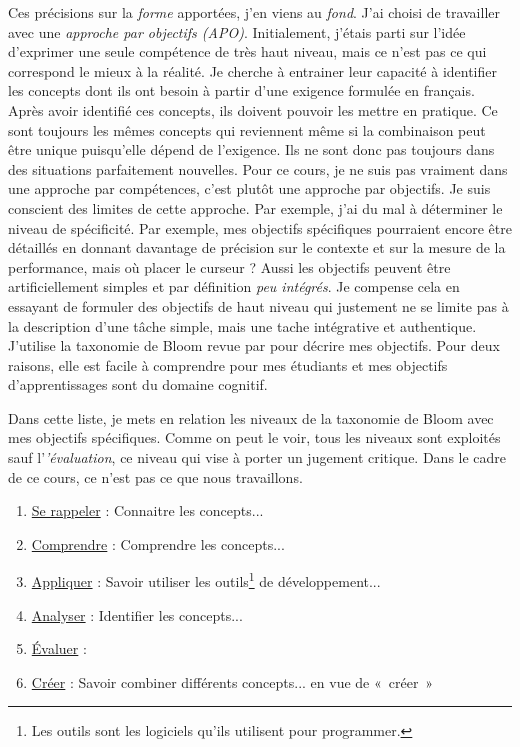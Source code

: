 Ces précisions sur la \emph{forme} apportées, j'en viens au \emph{fond}. J'ai choisi de travailler avec une \emph{approche par objectifs (APO)}. Initialement, j’étais parti sur l’idée d’exprimer une seule compétence de très haut niveau, mais ce n'est pas ce qui correspond le mieux à la réalité. Je cherche à entrainer leur capacité à identifier les concepts dont ils ont besoin à partir d'une exigence formulée en français. Après avoir identifié ces concepts, ils doivent pouvoir les mettre en pratique. Ce sont toujours les mêmes concepts qui reviennent même si la combinaison peut être unique puisqu'elle dépend de l'exigence. Ils ne sont donc pas toujours dans des situations parfaitement nouvelles. Pour ce cours, je ne suis pas vraiment dans une approche par compétences, c’est plutôt une approche par objectifs. Je suis conscient des limites de cette approche. Par exemple, j'ai du mal à déterminer le niveau de spécificité. Par exemple, mes objectifs spécifiques pourraient encore être détaillés en donnant davantage de précision sur le contexte et sur la mesure de la performance, mais où placer le curseur ? Aussi les objectifs peuvent être artificiellement simples et par définition \emph{peu intégrés}. Je compense cela en essayant de formuler des objectifs de haut niveau qui justement ne se limite pas à la description d'une tâche simple, mais une tache intégrative et authentique. J'utilise la taxonomie de Bloom revue par \citet{anderson2001taxonomy} pour décrire mes objectifs. Pour deux raisons, elle est facile à comprendre pour mes étudiants et mes objectifs d'apprentissages sont du domaine cognitif.

Dans cette liste, je mets en relation les niveaux de la taxonomie de Bloom avec mes objectifs spécifiques. Comme on peut le voir, tous les niveaux sont exploités sauf l'\emph{'évaluation}, ce niveau qui vise à porter un jugement critique. Dans le cadre de ce cours, ce n'est pas ce que nous travaillons.
\begin{enumerate}
    \item \underline{Se rappeler} : Connaitre les concepts...
    \item \underline{Comprendre} : Comprendre les concepts...
    \item \underline{Appliquer} : Savoir utiliser les outils\footnote{Les outils sont les logiciels qu'ils utilisent pour programmer.} de développement...
    \item \underline{Analyser} : Identifier les concepts...
    \item \underline{Évaluer} :
    \item \underline{Créer} : Savoir combiner différents concepts... en vue de «~créer~»
\end{enumerate}

